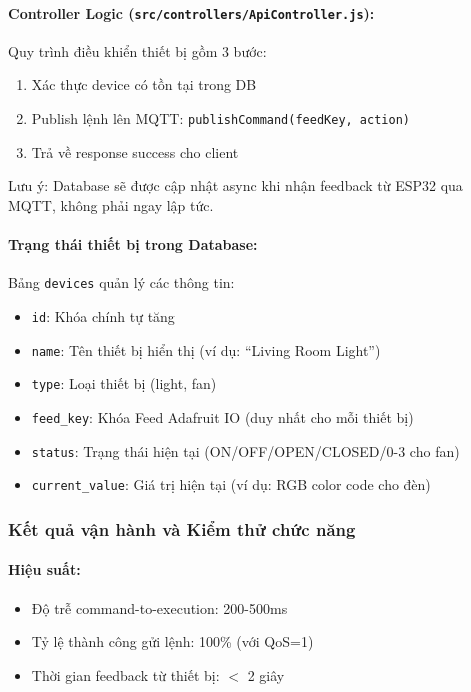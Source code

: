 \paragraph{Controller Logic (\texttt{src/controllers/ApiController.js}):}

Quy trình điều khiển thiết bị gồm 3 bước:
\begin{enumerate}
    \item Xác thực device có tồn tại trong DB
    \item Publish lệnh lên MQTT: \texttt{publishCommand(feedKey, action)}
    \item Trả về response success cho client
\end{enumerate}

Lưu ý: Database sẽ được cập nhật async khi nhận feedback từ ESP32 qua MQTT, không phải ngay lập tức.

\paragraph{Trạng thái thiết bị trong Database:}

Bảng \texttt{devices} quản lý các thông tin:
\begin{itemize}
    \item \texttt{id}: Khóa chính tự tăng
    \item \texttt{name}: Tên thiết bị hiển thị (ví dụ: ``Living Room Light'')
    \item \texttt{type}: Loại thiết bị (light, fan)
    \item \texttt{feed\_key}: Khóa Feed Adafruit IO (duy nhất cho mỗi thiết bị)
    \item \texttt{status}: Trạng thái hiện tại (ON/OFF/OPEN/CLOSED/0-3 cho fan)
    \item \texttt{current\_value}: Giá trị hiện tại (ví dụ: RGB color code cho đèn)
\end{itemize}

\subsubsection{Kết quả vận hành và Kiểm thử chức năng}

\paragraph{Hiệu suất:}
\begin{itemize}
    \item Độ trễ command-to-execution: 200-500ms
    \item Tỷ lệ thành công gửi lệnh: 100\% (với QoS=1)
    \item Thời gian feedback từ thiết bị: $<$ 2 giây
\end{itemize}

